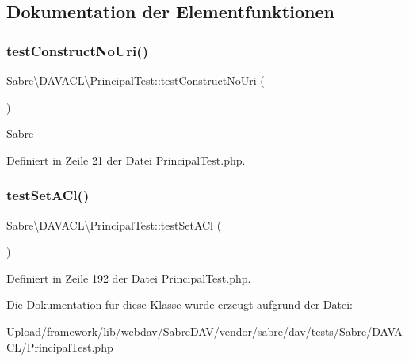 \subsection{Dokumentation der Elementfunktionen}
\mbox{\label{class_sabre_1_1_d_a_v_a_c_l_1_1_principal_test_ad25b2340f028d3606eaa8ce3cfe1426a}} 
\subsubsection{\texorpdfstring{test\+Construct\+No\+Uri()}{testConstructNoUri()}}
{\footnotesize\ttfamily Sabre\textbackslash{}\+D\+A\+V\+A\+C\+L\textbackslash{}\+Principal\+Test\+::test\+Construct\+No\+Uri (\begin{DoxyParamCaption}{ }\end{DoxyParamCaption})}

Sabre 

Definiert in Zeile 21 der Datei Principal\+Test.\+php.

\mbox{\label{class_sabre_1_1_d_a_v_a_c_l_1_1_principal_test_a33e587f3020a6605de75adc7e803c461}} 
\subsubsection{\texorpdfstring{test\+Set\+A\+Cl()}{testSetACl()}}
{\footnotesize\ttfamily Sabre\textbackslash{}\+D\+A\+V\+A\+C\+L\textbackslash{}\+Principal\+Test\+::test\+Set\+A\+Cl (\begin{DoxyParamCaption}{ }\end{DoxyParamCaption})}



Definiert in Zeile 192 der Datei Principal\+Test.\+php.



Die Dokumentation für diese Klasse wurde erzeugt aufgrund der Datei\+:\begin{DoxyCompactItemize}
\item 
Upload/framework/lib/webdav/\+Sabre\+D\+A\+V/vendor/sabre/dav/tests/\+Sabre/\+D\+A\+V\+A\+C\+L/Principal\+Test.\+php\end{DoxyCompactItemize}
